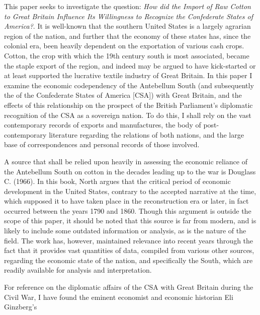 
This paper seeks to investigate the question: \flq{} \textit{How did the Import of Raw Cotton to Great Britain Influence Its Willingness to Recognize the
Confederate States of America?}\frq{}. It is well-known that the southern United States is a largely agrarian region of the nation, and further that the 
economy of these states has, since the colonial era, been heavily dependent on the exportation of various \flq{}cash crops\frq{}. Cotton, the crop with which 
the 19th century south is most associated, became the staple export of the region, and indeed may be argued to have kick-started or at least supported the 
lucrative textile industry of Great Britain. In this paper I examine the economic codependency of the Antebellum South (and subsequently the of the 
Confederate States of America [CSA]) with Great Britain, and the effects of this relationship on the prospect of the British Parliament's diplomatic 
recognition of the CSA as a sovereign nation. To do this, I shall rely on the vast contemporary records of exports and manufactures, the body of post-
contemporary literature regarding the relations of both nations, and the large base of correspondences and personal records of those involved.

A source that shall be relied upon heavily in assessing the economic reliance of the Antebellum South on cotton in the decades leading up to the war is 
Douglass C.  (1966). In this book, North argues that the critical period of economic development in the United States, 
contrary to the accepted narrative at the time, which supposed it to have taken place in the reconstruction era or later, in fact occurred between the
years 1790 and 1860. Though this argument is outside the scope of this paper, it should be noted that this source is far from modern, and is likely
to include some outdated information or analysis, as is the nature of the field. The work has, however, maintained relevance into recent years
through the fact that it provides vast quantities of data, compiled from various other sources, regarding the economic state of the nation, and specifically
the South, which are readily available for analysis and interpretation.

For reference on the diplomatic affairs of the CSA with Great Britain during the Civil War, I have found the eminent economist and economic historian Eli 
Ginzberg's \shortcite{}